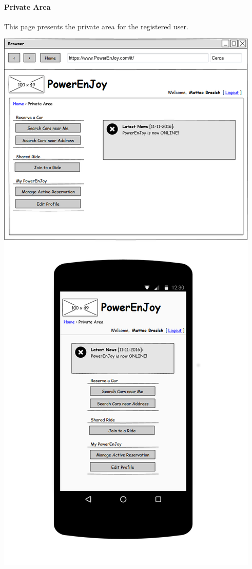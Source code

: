 \paragraph{Private Area} This page presents the private area for the registered user.
\begin{center}
	\includegraphics[width=0.6\linewidth]{"img/ui/private-area"}
\end{center}
\pagebreak

